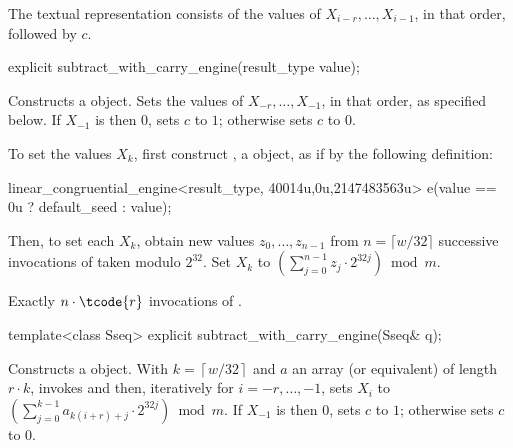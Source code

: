 \pnum
The textual representation%
%
consists of the values of
 $X_{i-r}, \dotsc, X_{i-1}$,
in that order, followed by $c$.


%
\begin{itemdecl}
explicit subtract_with_carry_engine(result_type value);
\end{itemdecl}

\begin{itemdescr}
\pnum\effects Constructs a  object.
 Sets the values of
 $X_{-r}, \dotsc, X_{-1}$,
 in that order, as specified below.
 If $X_{-1}$ is then $0$,
 sets $c$ to $1$;
 otherwise sets $c$ to $0$.

 To set the values $X_k$,
 first construct , a  object,
 as if by the following definition:
\begin{codeblock}
linear_congruential_engine<result_type,
                          40014u,0u,2147483563u> e(value == 0u ? default_seed : value);
\end{codeblock}
 Then, to set each $X_k$,
 obtain new values $z_0, \dotsc, z_{n-1}$
 from $n = \lceil w/32 \rceil$ successive invocations
 of  taken modulo $2^{32}$.
 Set $X_k$ to $\left( \sum_{j=0}^{n-1} z_j \cdot 2^{32j}\right) \bmod m$.

\pnum\complexity Exactly $n \cdot \tcode{r}$ invocations
 of .
\end{itemdescr}



%
\begin{itemdecl}
template<class Sseq> explicit subtract_with_carry_engine(Sseq& q);
\end{itemdecl}

\begin{itemdescr}
\pnum\effects Constructs a  object.
 With
 $k = \left\lceil w / 32 \right\rceil$
 and $a$ an array (or equivalent)
 of length $r \cdot k$,
 invokes 
 and then, iteratively for $i = -r, \dotsc, -1$,
 sets $X_i$
 to $ \left(\sum_{j=0}^{k-1}a_{k(i+r)+j} \cdot 2^{32j} \right) \bmod m $.
 If $X_{-1}$ is then $0$,
 sets $c$ to $1$;
 otherwise sets $c$ to $0$.
\end{itemdescr}


